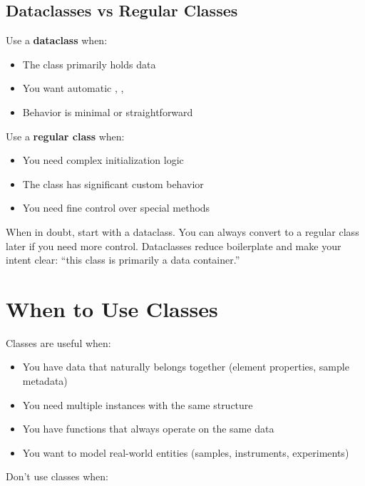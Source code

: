 \subsection{Dataclasses vs Regular Classes}

Use a \textbf{dataclass} when:
\begin{itemize}
    \item The class primarily holds data
    \item You want automatic , , 
    \item Behavior is minimal or straightforward
\end{itemize}

Use a \textbf{regular class} when:
\begin{itemize}
    \item You need complex initialization logic
    \item The class has significant custom behavior
    \item You need fine control over special methods
\end{itemize}

\begin{tip}
When in doubt, start with a dataclass. You can always convert to a regular class later if you need more control. Dataclasses reduce boilerplate and make your intent clear: ``this class is primarily a data container.''
\end{tip}

\section{When to Use Classes}
\label{sec:when-classes}

Classes are useful when:

\begin{itemize}
    \item You have data that naturally belongs together (element properties, sample metadata)
    \item You need multiple instances with the same structure
    \item You have functions that always operate on the same data
    \item You want to model real-world entities (samples, instruments, experiments)
\end{itemize}

Don't use classes when:

